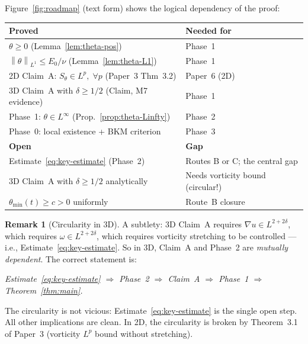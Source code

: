 \documentclass[11pt]{article}
\theoremstyle{definition}
\newtheorem{remark}[theorem]{Remark}
\theoremstyle{remark}
\newcommand{\norm}[1]{\left\|#1\right\|}
\newcommand{\grad}{\nabla}
\begin{document}
Figure~\ref{fig:roadmap} (text form) shows the logical dependency of the proof:

\begin{center}
\begin{tabular}{@{}ll@{}}
\toprule
\textbf{Proved} & \textbf{Needed for} \\
\midrule
$\theta\geq 0$ (Lemma~\ref{lem:theta-pos}) & Phase~1 \\
$\norm{\theta}_{L^1}\leq E_0/\nu$ (Lemma~\ref{lem:theta-L1}) & Phase~1 \\
2D Claim~A: $S_\theta\in L^p,\;\forall p$ (Paper~3 Thm~3.2) & Paper~6 (2D) \\
3D Claim~A with $\delta\geq 1/2$ (Claim, M7 evidence) & Phase~1 \\
Phase~1: $\theta\in L^\infty$ (Prop.~\ref{prop:theta-Linfty}) & Phase~2 \\
Phase~0: local existence + BKM criterion & Phase~3 \\
\midrule
\textbf{Open} & \textbf{Gap} \\
\midrule
Estimate~\eqref{eq:key-estimate} (Phase~2) & Routes B or C; the central gap \\
3D Claim~A with $\delta\geq 1/2$ analytically & Needs vorticity bound (circular!) \\
$\theta_{\min}(t)\geq c>0$ uniformly & Route~B closure \\
\bottomrule
\end{tabular}
\end{center}

\begin{remark}[Circularity in 3D]
  A subtlety: 3D Claim~A requires $\grad u\in L^{2+2\delta}$, which requires
  $\omega\in L^{2+2\delta}$, which requires vorticity stretching to be controlled —
  i.e., Estimate~\eqref{eq:key-estimate}.  So in 3D, Claim~A and Phase~2 are
  \emph{mutually dependent}.  The correct statement is:

  \begin{center}
  \emph{Estimate~\eqref{eq:key-estimate} $\Rightarrow$ Phase~2 $\Rightarrow$ Claim~A
  $\Rightarrow$ Phase~1 $\Rightarrow$ Theorem~\ref{thm:main}.}
  \end{center}

  The circularity is not vicious: Estimate~\eqref{eq:key-estimate} is the
  single open step.  All other implications are clean.  In 2D, the circularity
  is broken by Theorem~3.1 of Paper~3 (vorticity $L^p$ bound without stretching).
\end{remark}
\end{document}
